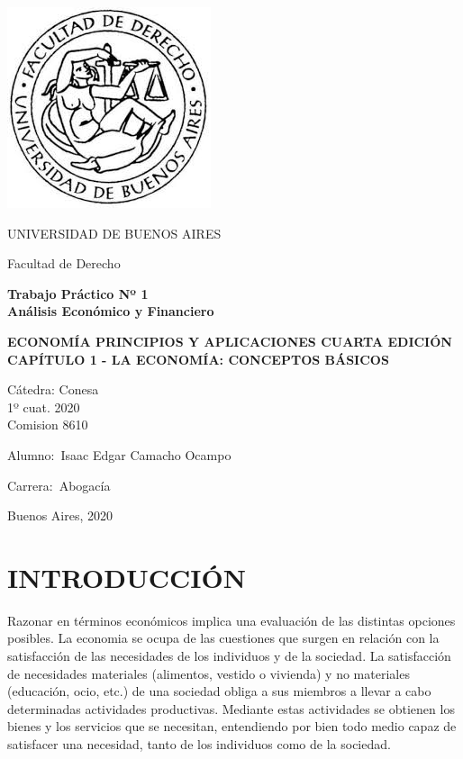 \documentclass[12pt]{book}
\begin{document}
\thispagestyle{empty}

\vspace{3cm}
\begin {center}

\includegraphics[scale=.4]{descarga.jpeg}

\medskip
UNIVERSIDAD DE BUENOS AIRES

Facultad de Derecho

\vspace{3cm}

\textbf{\huge 	Trabajo Práctico Nº 1}
\\
\textbf{\huge Análisis Económico y Financiero}

\vspace{2cm}

\textbf{ECONOMÍA PRINCIPIOS Y APLICACIONES CUARTA EDICIÓN}
\\
\textbf{CAPÍTULO 1 - LA ECONOMÍA: CONCEPTOS BÁSICOS}

\vspace{2cm}
Cátedra: Conesa
\\
1º cuat. 2020									            
\\
Comision 8610

\vspace{2cm}


\end {center}


\vspace{2.5cm}

\noindent Alumno:\,	Isaac Edgar Camacho Ocampo
 
\noindent Carrera:\,	Abogac\'ia

\vspace{1cm}

\noindent Buenos Aires, 2020


\tableofcontents

\chapter{INTRODUCCIÓN}
Razonar en términos económicos implica una evaluación de las distintas opciones posibles. La economia se ocupa de las cuestiones que surgen en relación con la satisfacción de las necesidades de los individuos y de la sociedad. La satisfacción de necesidades materiales (alimentos, vestido o vivienda) y no materiales (educación, ocio, etc.) de una sociedad obliga a sus miembros a llevar a cabo determinadas actividades productivas. Mediante estas actividades se obtienen los bienes y los servicios que se necesitan, entendiendo por bien todo medio capaz de satisfacer una necesidad, tanto de los individuos como de la sociedad.
\end{document}
